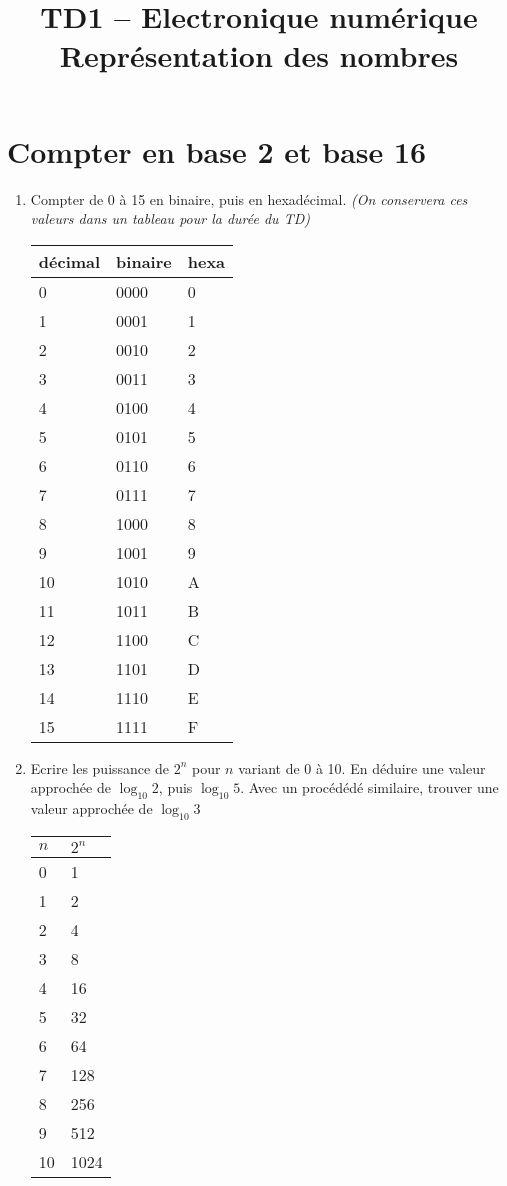 \documentclass[a4paper,11pt]{article}
\title{{\Huge TD1 -- Electronique numérique}\\Représentation des nombres}
\date{}
\begin{document}
\maketitle

\section{Compter en base 2 et base 16}

\begin{enumerate}
\item{Compter de 0 à 15 en binaire, puis en hexadécimal. {\it (On conservera ces valeurs dans un tableau pour la durée du TD)}}
\begin{center}
  \begin{tabular}{|l|l|l|}
    \hline
    décimal & binaire & hexa \\
    \hline \hline
    0 & 0000 & 0 \\
    1 & 0001 & 1 \\
    2 & 0010 & 2 \\
    3 & 0011 & 3 \\
    4 & 0100 & 4 \\
    5 & 0101 & 5 \\
    6 & 0110 & 6 \\
    7 & 0111 & 7 \\
    8 & 1000 & 8 \\
    9 & 1001 & 9 \\
    10 & 1010 & A \\
    11 & 1011 & B \\
    12 & 1100 & C \\
    13 & 1101 & D \\
    14 & 1110 & E \\
    15 & 1111 & F \\

     \hline
  \end{tabular}
\end{center}

\item{Ecrire les puissance de $2^n$ pour $n$ variant de 0 à 10. En déduire une valeur approchée de $\log_{10} 2$, puis $\log_{10} 5$. Avec un procédédé similaire, trouver une valeur approchée de $\log_{10} 3$}
\begin{center}
  \begin{tabular}{|l|l|}
    \hline
    $n$ & $2^n$ \\
    \hline \hline
    0 & 1 \\
    1 & 2 \\
    2 & 4 \\
    3 & 8 \\
    4 & 16 \\
    5 & 32 \\
    6 & 64 \\
    7 & 128 \\
    8 & 256 \\
    9 & 512 \\
    10 & 1024 \\
     \hline
  \end{tabular}
\end{center}


\end{enumerate}
\end{document}
